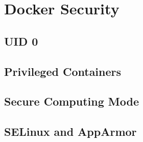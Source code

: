 \section{Docker Security}
\label{sec::security}


\subsection{UID 0}
\label{sec::security:uid0}

\subsection{Privileged Containers}
\label{sec::security:priv-cont}

\subsection{Secure Computing Mode}
\label{sec::security:sec-compt}

\subsection{SELinux and AppArmor}
\label{sec::security:sel-apparm}

